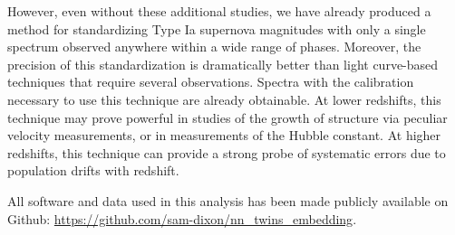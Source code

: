 However, even without these additional studies, we have already produced a method for standardizing Type Ia supernova magnitudes with only a single spectrum observed anywhere within a wide range of phases. Moreover, the precision of this standardization is dramatically better than light curve-based techniques that require several observations. Spectra with the calibration necessary to use this technique are already obtainable. At lower redshifts, this technique may prove powerful in studies of the growth of structure via peculiar velocity measurements, or in measurements of the Hubble constant. At higher redshifts, this technique can provide a strong probe of systematic errors due to population drifts with redshift.

All software and data used in this analysis has been made publicly available on Github: \url{https://github.com/sam-dixon/nn_twins_embedding}.
